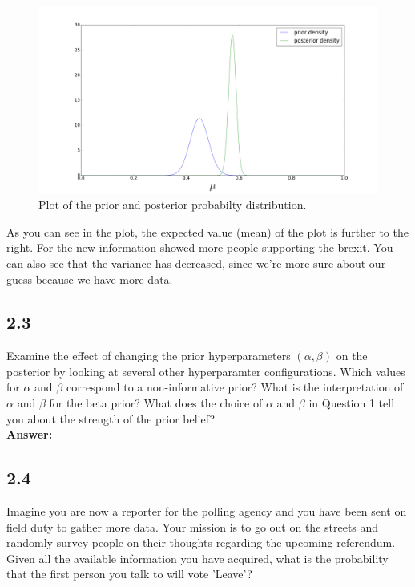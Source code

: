 \documentclass[a4paper]{article}
\begin{document}
\begin{figure}[H]
\includegraphics[width=\textwidth]{BetaPlotEx2,2.png}
\caption{Plot of the prior and posterior probabilty distribution. }
\end{figure}

As you can see in the plot, the expected value (mean) of the plot is further to the right. For the new information showed more people supporting the brexit. You can also see that the variance has decreased, since we're more sure about our guess because we have more data.

\subsection*{2.3}

Examine the effect of changing the prior hyperparameters $(\alpha, \beta)$ on the posterior by looking at several other hyperparamter configurations. Which values for $\alpha$ and $\beta$ correspond to a non-informative prior? What is the interpretation of $\alpha$ and $\beta$ for the beta prior? What does the choice of $\alpha$ and $\beta$ in Question 1 tell you about the strength of the prior belief?\\


\textbf{Answer:}\\






\subsection*{2.4}

Imagine you are now a reporter for the polling agency and you have been sent on field duty to gather more data. Your mission is to go out on the streets and randomly survey people on their thoughts regarding the upcoming referendum. Given all the available information you have acquired, what is the probability that the first person you talk to will vote 'Leave'?\\
\end{document}
